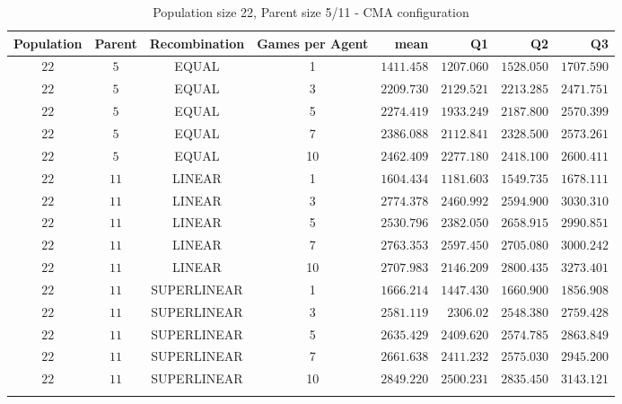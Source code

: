\begin{table}[H]
\centering
\small
\begin{tabular}{c c c c r r r r}
Population & Parent & Recombination & Games per Agent & mean & Q1 & Q2 & Q3\\
\hline
$22$ & $5$ & EQUAL & 1 & $1411.458$ & $1207.060$ & $1528.050$ & $1707.590$\\
$22$ & $5$ & EQUAL & 3 & $2209.730$ & $2129.521$ & $2213.285$ & $2471.751$\\
$22$ & $5$ & EQUAL & 5 & $2274.419$ & $1933.249$ & $2187.800$ & $2570.399$\\
$22$ & $5$ & EQUAL & 7 & $2386.088$ & $2112.841$ & $2328.500$ & $2573.261$\\
\hdashline
$22$ & $5$ & EQUAL & 10 & $2462.409$ & $2277.180$ & $2418.100$ & $2600.411$\\
\hdashline
$22$ & $11$ & LINEAR & 1 & $1604.434$ & $1181.603$ & $1549.735$ & $1678.111$\\
$22$ & $11$ & LINEAR & 3 & $2774.378$ & $2460.992$ & $2594.900$ & $3030.310$\\
$22$ & $11$ & LINEAR & 5 & $2530.796$ & $2382.050$ & $2658.915$ & $2990.851$\\
\hdashline
$22$ & $11$ & LINEAR & 7 & $2763.353$ & $2597.450$ & $2705.080$ & $3000.242$\\
\hdashline
$22$ & $11$ & LINEAR & 10 & $2707.983$ & $2146.209$ & $2800.435$ & $3273.401$\\
$22$ & $11$ & SUPERLINEAR & 1 & $1666.214$ & $1447.430$ & $1660.900$ & $1856.908$\\
$22$ & $11$ & SUPERLINEAR & 3 & $2581.119$ & $2306.02$ & $2548.380$ & $2759.428$\\
$22$ & $11$ & SUPERLINEAR & 5 & $2635.429$ & $2409.620$ & $2574.785$ & $2863.849$\\
$22$ & $11$ & SUPERLINEAR & 7 & $2661.638$ & $2411.232$ & $2575.030$ & $2945.200$\\
\hdashline
$22$ & $11$ & SUPERLINEAR & 10 & $2849.220$ & $2500.231$ & $2835.450$ & $3143.121$\\
\hdashline
\end{tabular}
\caption{Population size 22, Parent size 5/11 - CMA configuration}
\end{table}


